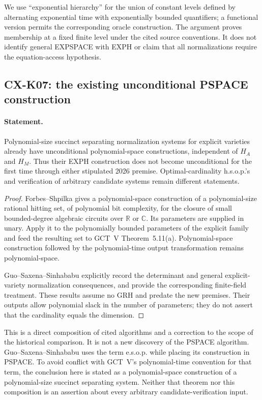 We use ``exponential hierarchy'' for the union of constant levels
defined by alternating exponential time with exponentially bounded
quantifiers; a functional version permits the corresponding oracle
construction. The argument proves membership at a fixed finite level
under the cited source conventions. It does not identify general
EXPSPACE with EXPH or claim that all normalizations require the
equation-access hypothesis.

\subsection{CX-K07: the existing unconditional PSPACE construction}
\label{cx:k07}

\paragraph{Statement.}
Polynomial-size succinct separating normalization systems for explicit
varieties already have unconditional polynomial-space constructions,
independent of $H_A$ and $H_M$. Thus their EXPH construction does not
become unconditional for the first time through either stipulated
2026 premise. Optimal-cardinality h.s.o.p.'s and verification of
arbitrary candidate systems remain different statements.

\begin{proof}
Forbes--Shpilka \cite[Theorem~7.1, preprint p.~21]{FS18} gives a
polynomial-space construction of a polynomial-size rational hitting
set, of polynomial bit complexity, for the closure of small
bounded-degree algebraic circuits over $\mathbb R$ or $\mathbb C$.
Its parameters are supplied in unary. Apply it to the polynomially
bounded parameters of the explicit family and feed the resulting set
to GCT~V Theorem~5.11(a). Polynomial-space construction followed by
the polynomial-time output transformation remains polynomial-space.

Guo--Saxena--Sinhababu \cite[Theorems~1.5 and~1.6, p.~6]{GSS19}
explicitly record the determinant and general explicit-variety
normalization consequences, and provide the corresponding finite-field
treatment. These results assume no GRH and predate the new premises.
Their outputs allow polynomial slack in the number of parameters;
they do not assert that the cardinality equals the dimension.
\end{proof}

This is a direct composition of cited algorithms and a correction to
the scope of the historical comparison. It is not a new discovery of
the PSPACE algorithm. Guo--Saxena--Sinhababu uses the term e.s.o.p.
while placing its construction in PSPACE. To avoid conflict with
GCT~V's polynomial-time convention for that term, the conclusion here
is stated as a polynomial-space construction of a polynomial-size
succinct separating system. Neither that theorem nor this composition
is an assertion about every arbitrary candidate-verification input.

